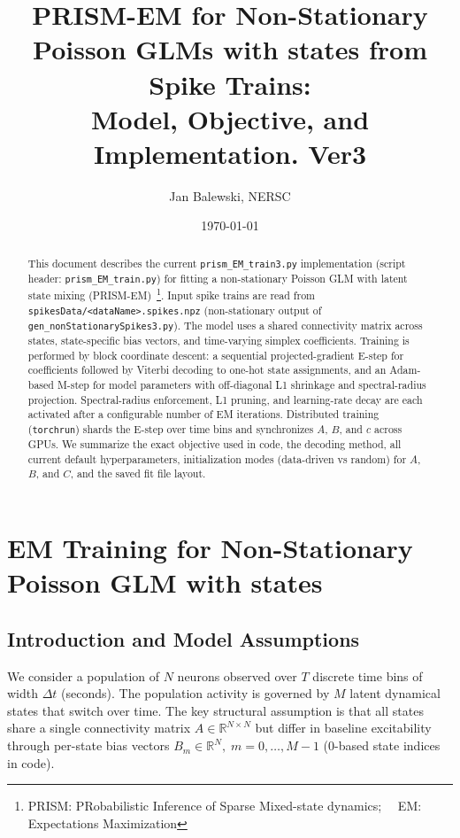 \documentclass[11pt]{article}
\title{PRISM-EM for Non-Stationary Poisson GLMs with states from Spike Trains:\\
Model, Objective, and Implementation. Ver3}
\author{Jan Balewski, NERSC}
\date{\today}
\begin{document}
\maketitle

\begin{abstract}
This document describes the current \texttt{prism\_EM\_train3.py} implementation
(script header: \texttt{prism\_EM\_train.py}) for fitting a non-stationary
Poisson GLM with latent state mixing (PRISM-EM)~\footnote{PRISM: PRobabilistic Inference of Sparse Mixed-state dynamics; ~~EM: Expectations Maximization}. Input spike trains are read from \texttt{spikesData/<dataName>.spikes.npz} (non-stationary output of \texttt{gen\_nonStationarySpikes3.py}). The model uses a shared connectivity matrix across states, state-specific bias vectors, and time-varying simplex coefficients. Training is performed by block coordinate descent: a sequential projected-gradient E-step for coefficients followed by Viterbi decoding to one-hot state assignments, and an Adam-based M-step for model parameters with off-diagonal L1 shrinkage and spectral-radius projection. Spectral-radius enforcement, L1 pruning, and learning-rate decay are each activated after a configurable number of EM iterations. Distributed training (\texttt{torchrun}) shards the E-step over time bins and synchronizes \(A\), \(B\), and \(c\) across GPUs. We summarize the exact objective used in code, the decoding method, all current default hyperparameters, initialization modes (data-driven vs random) for \(A\), \(B\), and \(C\), and the saved fit file layout.
\end{abstract}

\tableofcontents
\newpage

\section{EM Training for Non-Stationary Poisson GLM with states}
\label{sec:em}

\subsection{Introduction and Model Assumptions}

We consider a population of \(N\) neurons observed over \(T\) discrete time
bins of width \(\Delta t\) (seconds). The population activity is governed
by \(M\) latent dynamical states that switch over time. The key
structural assumption is that all states share a single
connectivity matrix \(A \in \mathbb{R}^{N \times N}\) but differ in
baseline excitability through per-state bias vectors
\(B_m \in \mathbb{R}^N,\; m = 0, \dots, M-1\) (0-based state indices in code).
\end{document}
